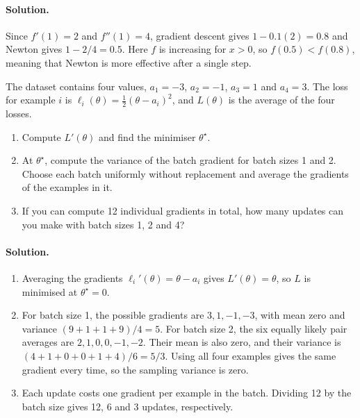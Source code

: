 \paragraph{Solution.}
Since $f'(1)=2$ and $f''(1)=4$, gradient descent gives $1-0.1(2)=0.8$ and Newton gives $1-2/4=0.5$. Here $f$ is increasing for $x>0$, so $f(0.5)<f(0.8)$, meaning that Newton is more effective after a single step. 

\begin{exercise}
The dataset contains four values, $a_1=-3$, $a_2=-1$, $a_3=1$ and $a_4=3$. The loss for example $i$ is $\ell_i(\theta)=\tfrac12(\theta-a_i)^2$, and $L(\theta)$ is the average of the four losses.
\begin{enumerate}
    \item Compute $L'(\theta)$ and find the minimiser $\theta^\star$.
    \item At $\theta^\star$, compute the variance of the batch gradient for batch sizes 1 and 2. Choose each batch uniformly without replacement and average the gradients of the examples in it.
    \item If you can compute 12 individual gradients in total, how many updates can you make with batch sizes 1, 2 and 4?
\end{enumerate}
\end{exercise}

\paragraph{Solution.}
\begin{enumerate}
    \item Averaging the gradients $\ell_i'(\theta)=\theta-a_i$ gives $L'(\theta)=\theta$, so $L$ is minimised at $\theta^\star=0$.
    \item For batch size 1, the possible gradients are $3,1,-1,-3$, with mean zero and variance $(9+1+1+9)/4=5$. For batch size 2, the six equally likely pair averages are $2,1,0,0,-1,-2$. Their mean is also zero, and their variance is $(4+1+0+0+1+4)/6=5/3$. Using all four examples gives the same gradient every time, so the sampling variance is zero.
    \item Each update costs one gradient per example in the batch. Dividing 12 by the batch size gives 12, 6 and 3 updates, respectively.
\end{enumerate}
